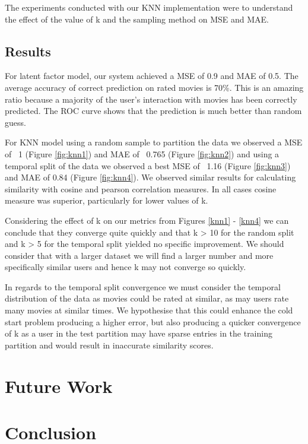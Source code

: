 \documentclass[12pt]{article}
\begin{document}
The experiments conducted with our KNN implementation were to understand the effect of the value of k and the sampling method on MSE and MAE.

\subsection{Results}

For latent factor model, our system achieved a MSE of 0.9 and MAE of 0.5. The average accuracy of correct prediction on rated movies is 70\%. This is an amazing ratio because a majority of the user's interaction with movies has been correctly predicted. The ROC curve shows that the prediction is much better than random guess.

For KNN model using a random sample to partition the data we observed a MSE of ~1 (Figure \ref{fig:knn1}) and MAE of ~0.765 (Figure \ref{fig:knn2}) and using a temporal split of the data we observed a best MSE of ~1.16 (Figure \ref{fig:knn3}) and MAE of 0.84 (Figure \ref{fig:knn4}). We observed similar results for calculating similarity with cosine and pearson correlation measures. In all cases cosine measure was superior, particularly for lower values of k.

Considering the effect of k on our metrics from Figures \ref{knn1} - \ref{knn4} we can conclude that they converge quite quickly and that k > 10 for the random split and k > 5 for the temporal split yielded no specific improvement. We should consider that with a larger dataset we will find a larger number and more specifically similar users and hence k may not converge so quickly. 

In regards to the temporal split convergence we must consider the temporal distribution of the data as movies could be rated at similar, as may users rate many movies at similar times. We hypothesise that this could enhance the cold start problem producing a higher error, but also producing a quicker convergence of k as a user in the test partition may have sparse entries in the training partition and would result in inaccurate similarity scores.    
 
\section{Future Work}

\section{Conclusion}

%



\end{document}
